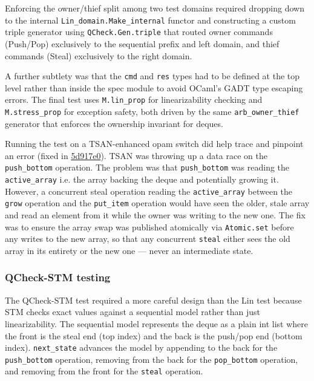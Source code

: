 \documentclass[11pt,a4paper]{article}
\begin{document}
Enforcing the owner/thief split among two test domains required dropping down to
the internal \texttt{Lin\_domain.Make\_internal} functor and constructing a custom
triple generator using \texttt{QCheck.Gen.triple} that routed owner commands
(Push/Pop) exclusively to the sequential prefix and left domain, and thief
commands (Steal) exclusively to the right domain.

A further subtlety was that the \texttt{cmd} and \texttt{res} types had to be
defined at the top level rather than inside the spec module to avoid OCaml's GADT
type escaping errors. The final test uses \texttt{M.lin\_prop} for
linearizability checking and \texttt{M.stress\_prop} for exception safety,
both driven by the same \texttt{arb\_owner\_thief} generator that enforces the
ownership invariant for deques.

Running the test on a TSAN-enhanced opam switch did help trace and pinpoint
an error (fixed in
\href{https://github.com/alinab/fork-cs6868_s26/commit/5d917e0d987c3c1a6a507697c65432e02636c1ce}{5d917e0}).
TSAN was throwing up a data race on the \texttt{push\_bottom} operation. The problem
was that \texttt{push\_bottom} was reading the \texttt{active\_array}
i.e. the array backing the deque and potentially growing it. However, a
concurrent steal operation reading the \texttt{active\_array} between the
\texttt{grow} operation and the \texttt{put\_item} operation would have seen
the older, stale array and read an element from it while the owner
was writing to the new one. The fix was to ensure the array swap was published
atomically via \texttt{Atomic.set} before any writes to the new array, so that any
concurrent \texttt{steal} either sees the old array in its entirety or the
new one — never an intermediate state.

\subsubsection{QCheck-STM testing}

The QCheck-STM test required a more careful design than the Lin test because
STM checks exact values against a sequential model rather than just
linearizability. The sequential model represents the deque as a plain int list
where the front is the steal end (top index) and the back is the push/pop end
(bottom index). \texttt{next\_state} advances the model by appending to the
back for the \texttt{push\_bottom} operation, removing from the back for the
\texttt{pop\_bottom} operation, and removing from the front for the
\texttt{steal} operation.
\end{document}
